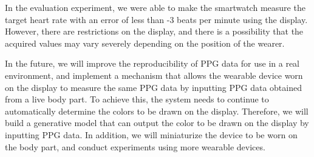 \documentclass[sigchi,authordraft]{acmart}
\begin{document}
In the evaluation experiment, we were able to make the smartwatch measure the target heart rate with an error of less than -3 beats per minute using the display. However, there are restrictions on the display, and there is a possibility that the acquired values may vary severely depending on the position of the wearer.\par

In the future, we will improve the reproducibility of PPG data for use in a real environment, and implement a mechanism that allows the wearable device worn on the display to measure the same PPG data by inputting PPG data obtained from a live body part. To achieve this, the system needs to continue to automatically determine the colors to be drawn on the display. Therefore, we will build a generative model that can output the color to be drawn on the display by inputting PPG data. In addition, we will miniaturize the device to be worn on the body part, and conduct experiments using more wearable devices.









\end{document}
